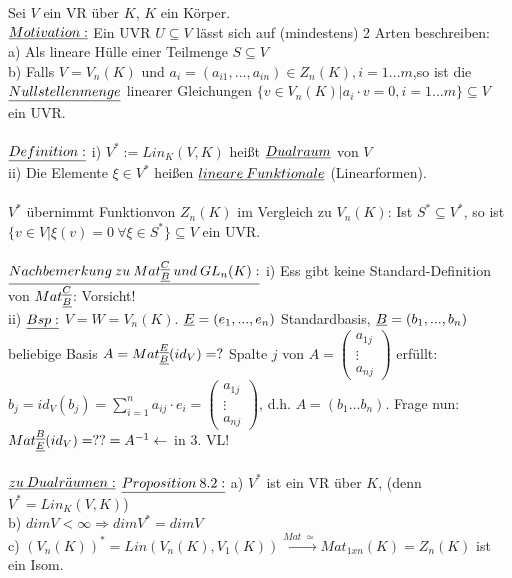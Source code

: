 \documentclass[fleqn, a4paper, 11pt]{scrartcl}
\theoremstyle{definition}
\begin{document}
Sei $V$ ein VR über $K$, $K$ ein Körper.\\
$\uline{Motivation:}$ Ein UVR $U\subseteq V$ lässt sich auf (mindestens) 2 Arten beschreiben:\\
a) Als lineare Hülle einer Teilmenge $S\subseteq V$\\
b) Falls $V=V_n(K)$ und $a_i=(a_{i1},...,a_{in})\in Z_n(K),i=1...m$,so ist die $\uline{Nullstellenmenge}$ linearer Gleichungen $\{v\in V_n(K)|a_i \cdot v=0,i=1...m\}\subseteq V$ ein UVR.\\
\\
$\uline{Definition:}$ i) $V^{\ast}:=Lin_K(V,K)$ heißt $\uline{Dualraum}$ von $V$\\
ii) Die Elemente $\xi\in V^{\ast}$ heißen $\uline{lineare\:Funktionale}$ (Linearformen).\\
\\
$V^{\ast}$ übernimmt \dq Funktion\dq von $Z_n(K)$ im Vergleich zu $V_n(K)$: Ist $S^{\ast}\subseteq V^{\ast}$, so ist $\{v\in V|\xi (v)=0\:\forall\xi\in S^{\ast}\}\subseteq V$ ein UVR.\\
\\
$\uline{Nachbemerkung\:zu\:Mat_{\uline{B}}^{\uline{C}}\:und\:GL_n(K):}$ i) Ess gibt keine Standard-Definition von $Mat_{\uline{B}}^{\uline{C}}$: Vorsicht!\\
ii) $\uline{Bsp:}$ $V=W=V_n(K)$. $\uline{E}=(e_1,...,e_n)$ Standardbasis, $\uline{B}=(b_1,...,b_n)$ beliebige Basis $A=Mat_{\uline{B}}^{\uline{E}}(id_V)=?$ Spalte $j$ von $A=\begin{pmatrix}
	a_{1j}\\
	\vdots\\
	a_{nj}
\end{pmatrix}$ erfüllt: $b_j=id_V(b_j)=\sum\limits_{i=1}^n a_{ij}\cdot e_i=\begin{pmatrix}
	a_{1j}\\
	\vdots\\
	a_{nj}
\end{pmatrix}$, d.h. $A=(b_1...b_n)$. Frage nun: $Mat_{\uline{E}}^{\uline{B}}(id_V)=??=A^{-1}\leftarrow$ in 3. VL!\\
\\
$\uline{zu\:Dualr\ddot{a}umen:}$
$\uline{Proposition\:8.2:}$ a) $V^{\ast}$ ist ein VR über $K$, (denn $V^{\ast}=Lin_K(V,K)$)\\
b) $dim V<\infty\Rightarrow dim V^{\ast}=dim V$\\
c) $(V_n(K))^{\ast}=Lin (V_n(K),V_1(K))\stackrel{Mat\:\simeq}{\rightarrow}Mat_{1xn}(K)=Z_n(K)$ ist ein Isom.\\
\end{document}
